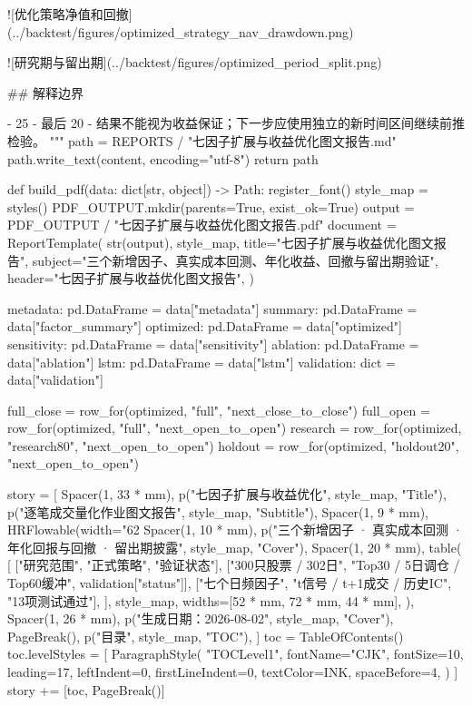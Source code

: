 \documentclass[UTF8,a4paper,fontset=fandol]{ctexart}
\begin{document}
\begin{ProjectCode}
![优化策略净值和回撤](../backtest/figures/optimized_strategy_nav_drawdown.png)

![研究期与留出期](../backtest/figures/optimized_period_split.png)

## 解释边界

- 25%
- 最后 20%
- 结果不能视为收益保证；下一步应使用独立的新时间区间继续前推检验。
"""
    path = REPORTS / "七因子扩展与收益优化图文报告.md"
    path.write_text(content, encoding="utf-8")
    return path


def build_pdf(data: dict[str, object]) -> Path:
    register_font()
    style_map = styles()
    PDF_OUTPUT.mkdir(parents=True, exist_ok=True)
    output = PDF_OUTPUT / "七因子扩展与收益优化图文报告.pdf"
    document = ReportTemplate(
        str(output),
        style_map,
        title="七因子扩展与收益优化图文报告",
        subject="三个新增因子、真实成本回测、年化收益、回撤与留出期验证",
        header="七因子扩展与收益优化图文报告",
    )

    metadata: pd.DataFrame = data["metadata"]
    summary: pd.DataFrame = data["factor_summary"]
    optimized: pd.DataFrame = data["optimized"]
    sensitivity: pd.DataFrame = data["sensitivity"]
    ablation: pd.DataFrame = data["ablation"]
    lstm: pd.DataFrame = data["lstm"]
    validation: dict = data["validation"]

    full_close = row_for(optimized, "full", "next_close_to_close")
    full_open = row_for(optimized, "full", "next_open_to_open")
    research = row_for(optimized, "research80", "next_open_to_open")
    holdout = row_for(optimized, "holdout20", "next_open_to_open")

    story = [
        Spacer(1, 33 * mm),
        p("七因子扩展与收益优化", style_map, "Title"),
        p("逐笔成交量化作业图文报告", style_map, "Subtitle"),
        Spacer(1, 9 * mm),
        HRFlowable(width="62%
        Spacer(1, 10 * mm),
        p("三个新增因子 · 真实成本回测 · 年化回报与回撤 · 留出期披露", style_map, "Cover"),
        Spacer(1, 20 * mm),
        table(
            [
                ["研究范围", "正式策略", "验证状态"],
                ["300只股票 / 302日", "Top30 / 5日调仓 / Top60缓冲", validation["status"]],
                ["七个日频因子", "t信号 / t+1成交 / 历史IC", "13项测试通过"],
            ],
            style_map,
            widths=[52 * mm, 72 * mm, 44 * mm],
        ),
        Spacer(1, 26 * mm),
        p("生成日期：2026-08-02", style_map, "Cover"),
        PageBreak(),
        p("目录", style_map, "TOC"),
    ]
    toc = TableOfContents()
    toc.levelStyles = [
        ParagraphStyle(
            "TOCLevel1",
            fontName="CJK",
            fontSize=10,
            leading=17,
            leftIndent=0,
            firstLineIndent=0,
            textColor=INK,
            spaceBefore=4,
        )
    ]
    story += [toc, PageBreak()]


\end{ProjectCode}
\end{document}
